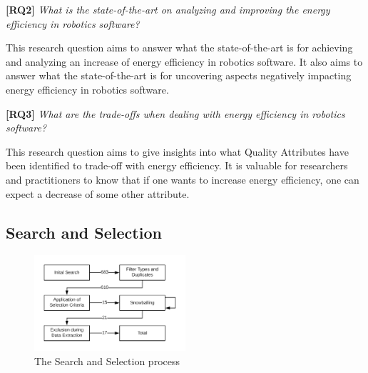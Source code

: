 \textbf{[RQ2]} \textit{What is the state-of-the-art on analyzing and improving the energy efficiency in robotics software?}

\vspace{5mm}

This research question aims to answer what the state-of-the-art is for achieving and analyzing an increase of energy efficiency in robotics software. It also aims to answer what the state-of-the-art is for uncovering aspects negatively impacting energy efficiency in robotics software.

\vspace{5mm}


\textbf{[RQ3]} \textit{What are the trade-offs when dealing with energy efficiency in robotics software?}

\vspace{5mm}

This research question aims to give insights into what Quality Attributes have been identified to trade-off with energy efficiency. 
It is valuable for researchers and practitioners to know that if one wants to increase energy efficiency, one can expect a decrease of some other attribute.


\subsection{Search and Selection}
\label{sec:study_design:search_selection}
\begin{figure}
    \centering
    \includegraphics[width=0.5\textwidth]{figures/selection_process.png}
    \caption{The Search and Selection process}
    \label{fig:search_selec_process}
\end{figure}

